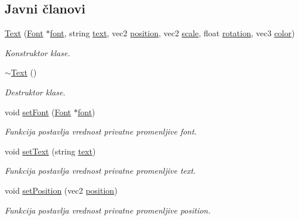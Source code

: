 \subsection*{Javni članovi}
\begin{DoxyCompactItemize}
\item 
\hyperlink{classfont_1_1Text_ab5d3ba772a694bed6c4aae538d78f4a2}{Text} (\hyperlink{classfont_1_1Font}{Font} $\ast$\hyperlink{classfont_1_1Text_abcaa4524d10d18e780ff793cca49a168}{font}, string \hyperlink{classfont_1_1Text_aee63974ff23d9e971bbd04fe041ccb07}{text}, vec2 \hyperlink{classfont_1_1Text_a65489ce0d1c13aaf242804987dba8b8d}{position}, vec2 \hyperlink{classfont_1_1Text_aec4f985d466d9f4b10cc426e393d6f14}{scale}, float \hyperlink{classfont_1_1Text_a4dc0a823fa5a8592b6d09e90b18226fb}{rotation}, vec3 \hyperlink{classfont_1_1Text_a83c69eadc420a466aaade60393f35b24}{color})
\begin{DoxyCompactList}\small\item\em Konstruktor klase. \end{DoxyCompactList}\item 
\hyperlink{classfont_1_1Text_a50beaa869e82f58675eec45b8b9a292d}{$\sim$\+Text} ()
\begin{DoxyCompactList}\small\item\em Destruktor klase. \end{DoxyCompactList}\item 
void \hyperlink{classfont_1_1Text_a0011424ac1cb959e601463e48c8e58dd}{set\+Font} (\hyperlink{classfont_1_1Font}{Font} $\ast$\hyperlink{classfont_1_1Text_abcaa4524d10d18e780ff793cca49a168}{font})
\begin{DoxyCompactList}\small\item\em Funkcija postavlja vrednost privatne promenljive font. \end{DoxyCompactList}\item 
void \hyperlink{classfont_1_1Text_a3eae0fce16f5ea89ae3b0fae55cf3e93}{set\+Text} (string \hyperlink{classfont_1_1Text_aee63974ff23d9e971bbd04fe041ccb07}{text})
\begin{DoxyCompactList}\small\item\em Funkcija postavlja vrednost privatne promenljive text. \end{DoxyCompactList}\item 
void \hyperlink{classfont_1_1Text_adf4bb1e9486fcb905ec62a6ad776dbde}{set\+Position} (vec2 \hyperlink{classfont_1_1Text_a65489ce0d1c13aaf242804987dba8b8d}{position})
\begin{DoxyCompactList}\small\item\em Funkcija postavlja vrednost privatne promenljive position. \end{DoxyCompactList}\item 

\end{DoxyCompactItemize}
